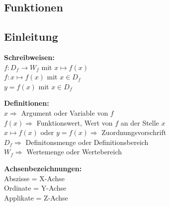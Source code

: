 \begin{flushleft}
	\section{Funktionen}
		\subsection{Einleitung}
			\begin{minipage}[t]{5cm}
				\textbf{Schreibweisen:}\\
				$f:D_f \rightarrow W_f$ mit $x \mapsto f(x)$\\
				$f:x \mapsto f(x)$ mit $x \in D_f$\\
				$y=f(x)$ mit $x \in D_f$
			\end{minipage}
			\hfill
			\begin{minipage}[t]{8cm}
				\textbf{Definitionen:}\\
				$x \Rightarrow$ Argument oder Variable von $f$\\
				$f(x) \Rightarrow$ Funktionswert, Wert von $f$ an der Stelle $x$\\ 
				$x \mapsto f(x)$ oder $y=f(x) \Rightarrow$ Zuordnungsvorschrift\\
				$D_f \Rightarrow$ Definitonsmenge oder Definitionsbereich\\ 
				$W_f \Rightarrow$ Wertemenge oder Wertebereich
			\end{minipage}
			\hfill
			\begin{minipage}[t]{4cm}
				\textbf{Achsenbezeichnungen:}\\
				Abszisse = X-Achse\\
				Ordinate = Y-Achse\\
				Applikate = Z-Achse
			\end{minipage}	


\end{flushleft}
